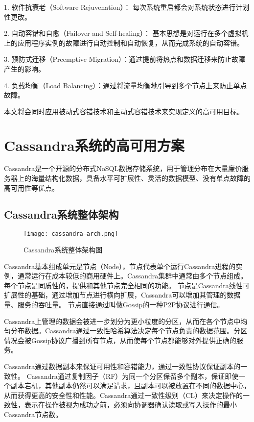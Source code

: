 1. 软件抗衰老（Software Rejuvenation）： 每次系统重启都会对系统状态进行计划性更改。

2. 自动容错和自愈（Failover and Self-healing）： 基本思想是对运行在多个虚拟机上的应用程序实例的故障进行自动控制和自动恢复，从而完成系统的自动容错。

3. 预防式迁移（Preemptive Migration）：通过提前将热点和数据迁移来防止故障产生的影响。

4. 负载均衡（Load Balancing）：通过将流量均衡地引导到多个节点上来防止单点故障。

本文将会同时应用被动式容错技术和主动式容错技术来实现定义的高可用目标。


\section{Cassandra系统的高可用方案}
Cassandra\cite{lakshman2010cassandra}是一个开源的分布式NoSQL数据存储系统，用于管理分布在大量廉价服务器上的海量结构化数据，具备水平可扩展性、灵活的数据模型、没有单点故障的高可用性等优点。

\subsection{Cassandra系统整体架构}

\begin{figure}
  \centering
  \texttt{[image: cassandra-arch.png]}
  \caption{Cassandra系统整体架构图}
  \label{fig:cassandra-arch}
\end{figure}

Cassandra基本组成单元是节点（Node），节点代表单个运行Cassandra进程的实例，通常运行在成本较低的商用硬件上。Cassandra集群中通常由多个节点组成。每个节点是同质性的，提供和其他节点完全相同的功能。
节点是Cassandra线性可扩展性的基础，通过增加节点进行横向扩展，Cassandra可以增加其管理的数据量、服务的吞吐量。
节点直接通过叫做Gossip的一种P2P协议进行通信。

Cassandra上管理的数据会被进一步划分为更小粒度的分区，从而在各个节点中均匀分布数据。Cassandra通过一致性哈希算法\cite{karger1997consistent}决定每个节点负责的数据范围。分区情况会被Gossip协议广播到所有节点，从而使每个节点都能够对外提供正确的服务。

Cassandra通过数据副本来保证可用性和容错能力，通过一致性协议保证副本的一致性。
Cassandra通过复制因子（RF）为同一个分区保留多个副本，保证即使一个副本宕机，其他副本仍然可以满足请求，且副本可以被放置在不同的数据中心，从而获得更高的安全性和性能。Cassandra通过一致性级别（CL）来决定操作的一致性，表示在操作被视为成功之前，必须向协调器确认读取或写入操作的最小Cassandra节点数。


